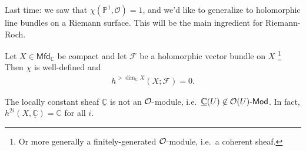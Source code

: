 \begin{remark}

Last time: we saw that \(\chi({\mathbb{P}}^1, {\mathcal{O}}) = 1\), and
we'd like to generalize to holomorphic line bundles on a Riemann
surface. This will be the main ingredient for Riemann-Roch.

\end{remark}

\begin{theorem}[?]

Let \(X \in {\mathsf{Mfd}}_{\mathbb{C}}\) be compact and let
\(\mathcal{F}\) be a holomorphic vector bundle on \(X\) \footnote{Or
  more generally a finitely-generated \({\mathcal{O}}{\hbox{-}}\)module,
  i.e.~a coherent sheaf.} Then \(\chi\) is well-defined and
\begin{align*} h^{> \dim_{\mathbb{C}}X}(X; \mathcal{F} ) = 0.\end{align*}

\end{theorem}

\begin{remark}

The locally constant sheaf \(\underline{{\mathbb{C}}}\) is not an
\({\mathcal{O}}{\hbox{-}}\)module,
i.e.~\(\underline{{\mathbb{C}}}(U) \not\in {{{\mathcal{O}}(U)}{\hbox{-}}\mathsf{Mod}}\).
In fact, \(h^{2i}(X, \underline{{\mathbb{C}}}) = {\mathbb{C}}\) for all
\(i\).

\end{remark}

